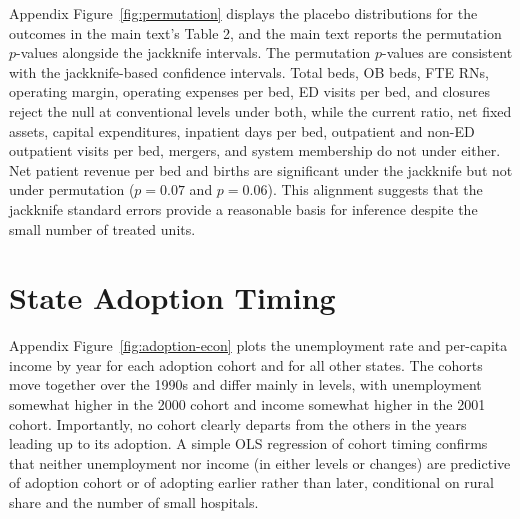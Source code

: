 \documentclass[a4paper, 12pt]{article}
\begin{document}
Appendix Figure~\ref{fig:permutation} displays the placebo distributions for the outcomes in the main text's Table 2, and the main text reports the permutation $p$-values alongside the jackknife intervals. The permutation $p$-values are consistent with the jackknife-based confidence intervals. Total beds, OB beds, FTE RNs, operating margin, operating expenses per bed, ED visits per bed, and closures reject the null at conventional levels under both, while the current ratio, net fixed assets, capital expenditures, inpatient days per bed, outpatient and non-ED outpatient visits per bed, mergers, and system membership do not under either. Net patient revenue per bed and births are significant under the jackknife but not under permutation ($p = 0.07$ and $p = 0.06$). This alignment suggests that the jackknife standard errors provide a reasonable basis for inference despite the small number of treated units.



\section{State Adoption Timing}
\label{sec:app-adoption}

Appendix Figure~\ref{fig:adoption-econ} plots the unemployment rate and per-capita income by year for each adoption cohort and for all other states. The cohorts move together over the 1990s and differ mainly in levels, with unemployment somewhat higher in the 2000 cohort and income somewhat higher in the 2001 cohort. Importantly, no cohort clearly departs from the others in the years leading up to its adoption. A simple OLS regression of cohort timing confirms that neither unemployment nor income (in either levels or changes) are predictive of adoption cohort or of adopting earlier rather than later, conditional on rural share and the number of small hospitals.
\end{document}
